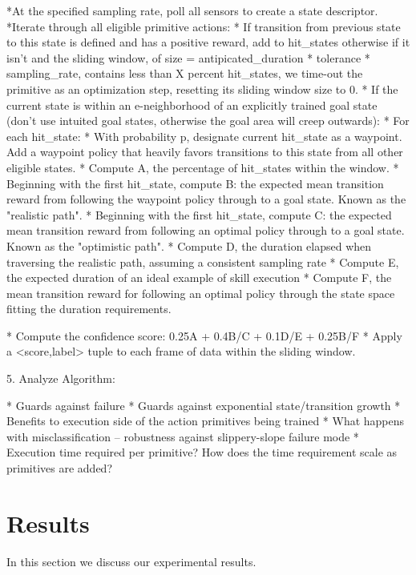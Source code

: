 \documentclass[letterpaper]{article}
\begin{document}
	*At the specified sampling rate, poll all sensors to create a state descriptor.
	*Iterate through all eligible primitive actions:
		* If transition from previous state to this state is defined and has a positive reward, add to hit_states
		  otherwise if it isn't and the sliding window, of size = antipicated_duration * tolerance * sampling_rate, contains less
		  than X percent hit_states, we time-out the primitive as an optimization step, resetting its sliding window size to 0.
		* If the current state is within an e-neighborhood of an explicitly trained goal state (don't use intuited goal states,
		  otherwise the goal area will creep outwards):
			* For each hit_state:
				* With probability p, designate current hit_state as a waypoint. Add a waypoint policy that heavily favors
				  transitions to this state from all other eligible states.
			* Compute A, the percentage of hit_states within the window.
			* Beginning with the first hit_state, compute B: the expected mean transition reward from following the waypoint policy through to a goal state. Known as the "realistic path".
			* Beginning with the first hit_state, compute C: the expected mean transition reward from following an optimal policy through to a goal state. Known as the "optimistic path".
			* Compute D, the duration elapsed when traversing the realistic path, assuming a consistent sampling rate
			* Compute E, the expected duration of an ideal example of skill execution
			* Compute F, the mean transition reward for following an optimal policy through the state space fitting the duration requirements.

			* Compute the confidence score: 0.25A + 0.4B/C + 0.1D/E + 0.25B/F
			* Apply a <score,label> tuple to each frame of data within the sliding window.



5. Analyze Algorithm:

	* Guards against failure
	* Guards against exponential state/transition growth
	* Benefits to execution side of the action primitives being trained
	* What happens with misclassification -- robustness against slippery-slope failure mode
	* Execution time required per primitive? How does the time requirement scale as primitives are added?

\section{Results}
\label{sec:result}
In this section we discuss our experimental results.
\end{document}

